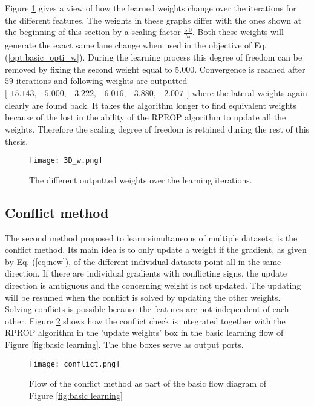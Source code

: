 Figure \ref{fig:3D_w} gives a view of how the learned weights change over the iterations for the different features. The weights in these graphs differ with the ones shown at the beginning of this section by a scaling factor $\frac{5.0}{\theta_2}$. Both these weights will generate the exact same lane change when used in the objective of Eq. (\ref{opt:basic_opti_w}). During the learning process this degree of freedom can be removed by fixing the second weight equal to $5.000$. Convergence is reached after $59$ iterations and following weights are outputted $\bigl[ \begin{smallmatrix} 15.143,&5.000,&3.222,&6.016,&3.880,&2.007\end{smallmatrix}\bigr]$ where the lateral weights again clearly are found back. It takes the algorithm longer to find equivalent weights because of the lost in the ability of the RPROP algorithm to update all the weights. Therefore the scaling degree of freedom is retained during the rest of this thesis. \\

 
\begin{figure}[h!]
	\centering
	\texttt{[image: 3D\_w.png]}
	\caption{The different outputted weights over the learning iterations.}
	\label{fig:3D_w}
\end{figure}

\subsection{Conflict method}\label{s:conflict_method}
 The second method proposed to learn simultaneous of multiple datasets, is the conflict method. Its main idea is to only update a weight if the gradient, as given by Eq. (\ref{eq:new}), of the different individual datasets point all in the same direction. If there are individual gradients with conflicting signs, the update direction is ambiguous and the concerning weight is not updated. The updating will be resumed when the conflict is solved by updating the other weights. Solving conflicts is possible because the features are not independent of each other. Figure \ref{fig:conflict} shows how the conflict check is integrated together with the RPROP algorithm in the 'update weights' box in the basic learning flow of Figure \ref{fig:basic learning}. The blue boxes serve as output ports.\\
 
  \begin{figure}[h!]
 	\centering
 	\texttt{[image: conflict.png]}
 	\caption{Flow of the conflict method as part of the basic flow diagram of Figure \ref{fig:basic learning}}
 	\label{fig:conflict}
 \end{figure}

